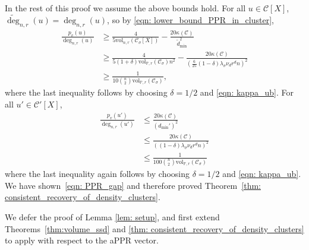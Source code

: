 \documentclass[11pt,twoside]{article}
\newcommand{\vol}{\mathrm{vol}}
\newcommand{\1}{\mathbf{1}}
\newcommand{\Xbf}{X}             %
\newcommand{\Pbb}{\mathbb{P}}
\newcommand{\Cset}{\mathcal{C}}
\newcommand{\Csig}{\Cset_{\sigma}}
\begin{document}
In the rest of this proof we assume the above bounds hold. For all $u \in \Cset[\Xbf]$, $\widetilde{\deg}_{n,r}(u) = \deg_{n,r}(u)$, so by \eqref{eqn: lower_bound_PPR_in_cluster},
\begin{align*}
\frac{p_v(u)}{\deg_{n,r}(u)} & \geq \frac{4}{5 \vol_{n,r}(\Csig[\Xbf])} - \frac{20 \kappa(\Cset)}{\widetilde{d}_{\min}^2} \\
& \geq \frac{4}{5(1+\delta)\vol_{\Pbb,r}(\Csig)n^2} - \frac{20\kappa(\Cset)}{\left(\frac{6}{25}(1 - \delta)\lambda_{\sigma}\nu_dr^dn\right)^2} \\
& \geq \frac{1}{10{n \choose 2}\vol_{\Pbb,r}(\Csig)},
\end{align*}
where the last inequality follows by choosing $\delta = 1/2$ and \eqref{eqn: kappa_ub}. For all $u' \in \Cset'[\Xbf]$, 
\begin{align}
\frac{p_v(u')}{\deg_{n,r}(u')} & \leq \frac{20\kappa(\Cset)}{(d_{\min}')^2} \nonumber \\
& \leq \frac{20\kappa(\Cset)}{\left((1 - \delta)\lambda_{\sigma}\nu_dr^dn\right)^2} \nonumber \\
& \leq \frac{1}{100{n \choose 2}\vol_{\Pbb,r}(\Csig)} \label{eqn:consistent_recovery_of_density_clusters_pf1}
\end{align}
where the last inequality again follows by choosing $\delta = 1/2$ and \eqref{eqn: kappa_ub}. We have shown~\eqref{eqn: PPR_gap} and therefore proved Theorem~\ref{thm: consistent_recovery_of_density_clusters}. 

We defer the proof of Lemma \ref{lem: setup}, and first extend Theorems~\ref{thm:volume_ssd} and \ref{thm: consistent_recovery_of_density_clusters} to apply with respect to the aPPR vector.
\end{document}
